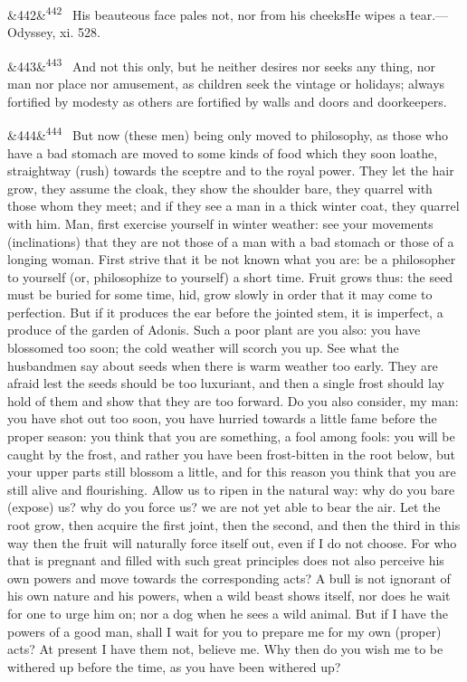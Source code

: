 \documentclass[12pt]{article}
\newcommand{\para}[1][]{\par\noindent\ifx&#1&\else\textsuperscript{\footnotesize #1}~\fi}
\begin{document}
\para[442] His beauteous face pales not, nor from his cheeksHe wipes a tear.—Odyssey, xi. 528.

\para[443] And not this only, but he neither desires nor seeks any thing, nor man nor place nor amusement, as children seek the vintage or holidays; always fortified by modesty as others are fortified by walls and doors and doorkeepers.

\para[444] But now (these men) being only moved to philosophy, as those who have a bad stomach are moved to some kinds of food which they soon loathe, straightway (rush) towards the sceptre and to the royal power. They let the hair grow, they assume the cloak, they show the shoulder bare, they quarrel with those whom they meet; and if they see a man in a thick winter coat, they quarrel with him. Man, first exercise yourself in winter weather: see your movements (inclinations) that they are not those of a man with a bad stomach or those of a longing woman. First strive that it be not known what you are: be a philosopher to yourself (or, philosophize to yourself) a short time. Fruit grows thus: the seed must be buried for some time, hid, grow slowly in order that it may come to perfection. But if it produces the ear before the jointed stem, it is imperfect, a produce of the garden of Adonis. Such a poor plant are you also: you have blossomed too soon; the cold weather will scorch you up. See what the husbandmen say about seeds when there is warm weather too early. They are afraid lest the seeds should be too luxuriant, and then a single frost should lay hold of them and show that they are too forward. Do you also consider, my man: you have shot out too soon, you have hurried towards a little fame before the proper season: you think that you are something, a fool among fools: you will be caught by the frost, and rather you have been frost-bitten in the root below, but your upper parts still blossom a little, and for this reason you think that you are still alive and flourishing. Allow us to ripen in the natural way: why do you bare (expose) us? why do you force us? we are not yet able to bear the air. Let the root grow, then acquire the first joint, then the second, and then the third in this way then the fruit will naturally force itself out, even if I do not choose. For who that is pregnant and filled with such great principles does not also perceive his own powers and move towards the corresponding acts? A bull is not ignorant of his own nature and his powers, when a wild beast shows itself, nor does he wait for one to urge him on; nor a dog when he sees a wild animal. But if I have the powers of a good man, shall I wait for you to prepare me for my own (proper) acts? At present I have them not, believe me. Why then do you wish me to be withered up before the time, as you have been withered up?
\end{document}
